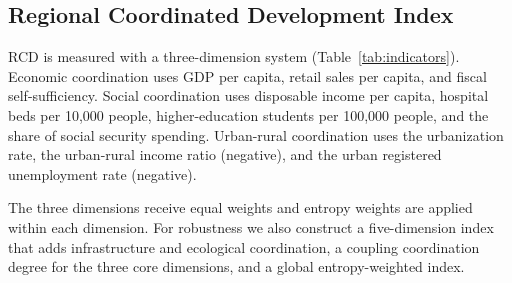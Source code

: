 \subsection{Regional Coordinated Development Index}

RCD is measured with a three-dimension system (Table~\ref{tab:indicators}). Economic coordination uses GDP per capita, retail sales per capita, and fiscal self-sufficiency. Social coordination uses disposable income per capita, hospital beds per 10,000 people, higher-education students per 100,000 people, and the share of social security spending. Urban-rural coordination uses the urbanization rate, the urban-rural income ratio (negative), and the urban registered unemployment rate (negative).

The three dimensions receive equal weights and entropy weights are applied within each dimension. For robustness we also construct a five-dimension index that adds infrastructure and ecological coordination, a coupling coordination degree for the three core dimensions, and a global entropy-weighted index.


